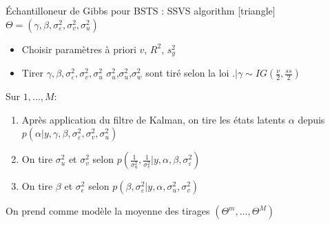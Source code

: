 \begin{frame}
    \small
\begin{exampleblock}{\'Echantilloneur de Gibbs pour BSTS : SSVS algorithm}
    [triangle]
    $\Theta=\left(\gamma, \beta, \sigma_{\varepsilon}^{2}, \sigma_{v}^{2}, \sigma_{u}^{2}\right)$
    \begin{itemize}
    \item Choisir paramètres à priori $v$, $R^2$, $s_y^2$
    \item Tirer $\gamma, \beta, \sigma_{\varepsilon}^{2}, \sigma_{v}^{2}, \sigma_{u}^{2}$ \hfill $\sigma_u^2$,$\sigma_u^2$,$\sigma_w^2$ sont tiré selon la loi $. | \gamma \sim I G\left(\frac{\nu}{2}, \frac{s s}{2}\right)$
    \end{itemize}
Sur $1, \ldots, M$:
\begin{enumerate}
\item Après application du filtre de Kalman, on tire les états latents $\alpha$ depuis $p\left(\alpha | y, \gamma, \beta, \sigma_{\varepsilon}^{2}, \sigma_{v}^{2}, \sigma_{u}^{2}\right)$
\item On tire $\sigma_u^2$ et $\sigma_v^2$ selon $p\left(\frac{1}{\sigma_{u}^{2}}, \frac{1}{\sigma_{v}^{2}} | y, \alpha, \beta, \sigma_{\varepsilon}^{2}\right)$
\item On tire $\beta$ et $\sigma_\epsilon^2$ selon $p\left(\beta, \sigma_{\varepsilon}^{2} | y, \alpha, \sigma_{u}^{2}, \sigma_{v}^{2}\right)$
\end{enumerate}

On prend comme modèle la moyenne des tirages $\left(\Theta^m, \ldots, \Theta^M\right)$

\end{exampleblock}

\end{frame}
